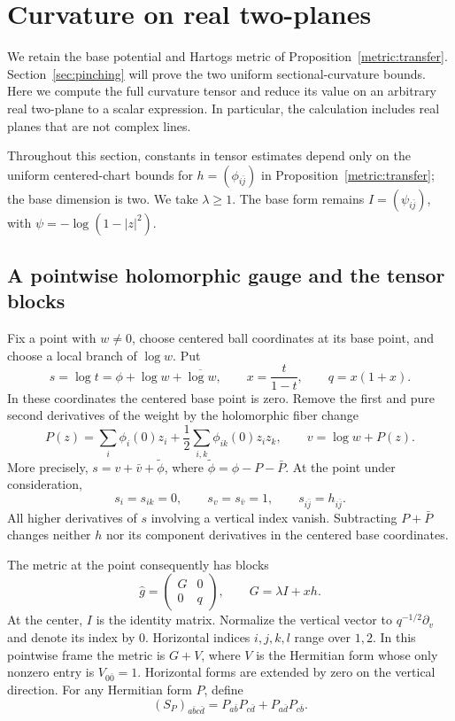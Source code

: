 \section{Curvature on real two-planes}\label{sec:curvature}

We retain the base potential and Hartogs metric of
Proposition~\ref{metric:transfer}.  Section~\ref{sec:pinching} will prove
the two uniform sectional-curvature bounds.  Here we compute the full
curvature tensor and reduce its value on an arbitrary real two-plane
to a scalar expression.  In particular, the calculation includes real
planes that are not complex lines.

Throughout this section, constants in tensor estimates depend only on
the uniform centered-chart bounds for $h=(\phi_{i\bar j})$ in
Proposition~\ref{metric:transfer}; the base dimension is two.
We take $\lambda\ge1$.  The base form remains
$I=(\psi_{i\bar j})$, with $\psi=-\log(1-|z|^2)$.

\subsection{A pointwise holomorphic gauge and the tensor blocks}

Fix a point with $w\ne0$, choose centered ball coordinates at its base
point, and choose a local branch of $\log w$.  Put
\[
 s=\log t=\phi+\log w+\overline{\log w},\qquad
 x=\frac{t}{1-t},\qquad q=x(1+x).
\]
In these coordinates the centered base point is zero.  Remove the first
and pure second derivatives of the weight by the holomorphic fiber change
\[
 P(z)=\sum_i\phi_i(0)z_i+
       \frac12\sum_{i,k}\phi_{ik}(0)z_i z_k,
 \qquad v=\log w+P(z).
\]
More precisely, $s=v+\bar v+\widetilde\phi$, where
$\widetilde\phi=\phi-P-\bar P$.  At the point under consideration,
\begin{equation}\label{curv:gauge}
 s_i=s_{ik}=0,\qquad s_v=s_{\bar v}=1,\qquad
 s_{i\bar j}=h_{i\bar j}.
\end{equation}
All higher derivatives of $s$ involving a vertical index vanish.
Subtracting $P+\bar P$ changes neither $h$ nor its component
derivatives in the centered base coordinates.

The metric at the point consequently has blocks
\[
 \widehat g=\begin{pmatrix}G&0\\0&q\end{pmatrix},
 \qquad G=\lambda I+xh.
\]
At the center, $I$ is the identity matrix.  Normalize the vertical
vector to $q^{-1/2}\partial_v$ and denote its index by $0$.
Horizontal indices $i,j,k,l$ range over $1,2$.
In this pointwise frame the metric is $G+V$, where $V$ is the
Hermitian form whose only nonzero entry is $V_{0\bar0}=1$.
Horizontal forms are extended by zero on the vertical direction.
For any Hermitian form $P$, define
\begin{equation}\label{curv:symmetric-tensor}
 (S_P)_{a\bar b c\bar d}
   =P_{a\bar b}P_{c\bar d}+P_{a\bar d}P_{c\bar b}.
\end{equation}

